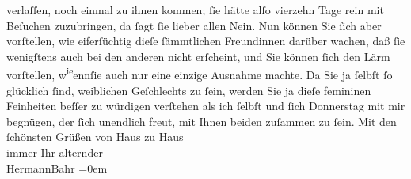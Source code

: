\begin{ledgroupsized}[t]{13cm}
               verlaſſen, noch einmal zu ihnen kommen; ſie hätte alſo vierzehn Tage rein mit
               Beſuchen zuzubringen, da ſagt ſie lieber allen Nein. Nun können Sie ſich aber
               vorſtellen, wie eiferſüchtig {\pb}dieſe ſämmtlichen
               Freundinnen darüber wachen, daß ſie wenigſtens auch bei den anderen nicht erſcheint,
               und Sie können ſich den Lärm vorſtellen, w\substVorne{}\textsuperscript{ie}\substDazwischen{}enn\substHinten{}{ }ſie auch nur eine einzige
               Ausnahme machte. Da Sie ja ſelbſt ſo glücklich ſind, weiblichen Geſchlechts zu ſein,
               werden Sie ja dieſe femininen Feinheiten beſſer zu würdigen verſtehen als ich ſelbſt
               und ſich Donnerstag mit mir begnügen, der ſich unendlich freut, mit
               Ihnen beiden zuſammen zu
               ſein.\pend
           \pstart
           Mit den ſchönsten Grüßen von Haus zu Haus{\\[\baselineskip]}immer Ihr alternder{\\[\baselineskip]}\spacefill\mbox{HermannBahr}\pend
           \leftskip=0em{}
         
         \endnumbering{}\end{ledgroupsized}  \newcommand{\dateiname}{L02060}\newcommand{\titel}{Hermann Bahr an Olga Schnitzler, 27. 4. 1912}\newcommand{\editorInnen}{Martin Anton Müller und Gerd-Hermann Susen}
      
